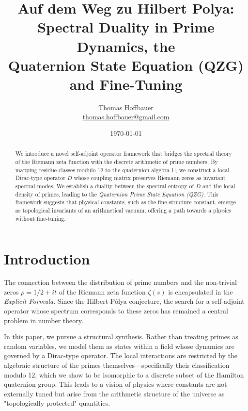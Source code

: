 \documentclass[11pt,a4paper,reqno]{article}
\theoremstyle{plain}
\theoremstyle{definition}
\theoremstyle{remark}
\begin{document}
\title{\textbf{Auf dem Weg zu Hilbert Polya:}\\ \Large Spectral Duality in Prime Dynamics, the \\ Quaternion State Equation (QZG) and Fine-Tuning}

\author{Thomas Hoffbauer \\ \small \href{mailto:thomas.hoffbauer@gmail.com}{thomas.hoffbauer@gmail.com}}
\date{\today}

\maketitle

\begin{abstract}
We introduce a novel self-adjoint operator framework that bridges the spectral theory of the Riemann zeta function with the discrete arithmetic of prime numbers. By mapping residue classes modulo 12 to the quaternion algebra $\mathbb{H}$, we construct a local Dirac-type operator $D$ whose coupling matrix preserves Riemann zeros as invariant spectral modes. We establish a duality between the spectral entropy of $D$ and the local density of primes, leading to the \textit{Quaternion Prime State Equation (QZG)}. This framework suggests that physical constants, such as the fine-structure constant, emerge as topological invariants of an arithmetical vacuum, offering a path towards a physics without fine-tuning.
\end{abstract}

\section{Introduction}

The connection between the distribution of prime numbers and the non-trivial zeros $\rho = 1/2 + it$ of the Riemann zeta function $\zeta(s)$ is encapsulated in the \textit{Explicit Formula}. Since the Hilbert-P{\'o}lya conjecture, the search for a self-adjoint operator whose spectrum corresponds to these zeros has remained a central problem in number theory.

In this paper, we pursue a structural synthesis. Rather than treating primes as random variables, we model them as states within a field whose dynamics are governed by a Dirac-type operator. The local interactions are restricted by the algebraic structure of the primes themselves—specifically their classification modulo 12, which we show to be isomorphic to a discrete subset of the Hamilton quaternion group. This leads to a vision of physics where constants are not externally tuned but arise from the arithmetic structure of the universe as "topologically protected" quantities.
\end{document}
